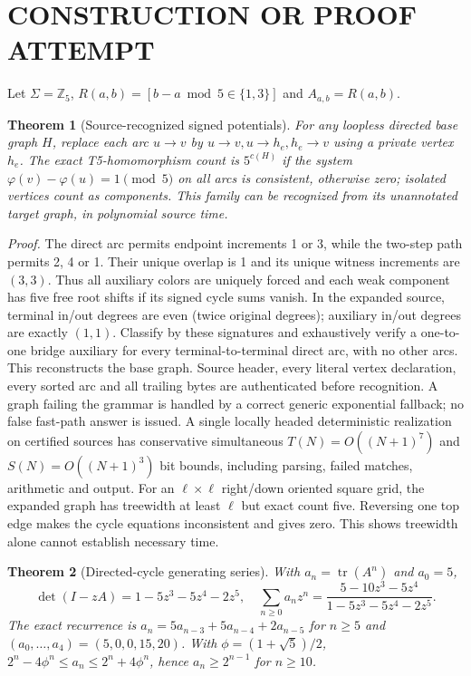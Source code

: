 \documentclass[11pt]{article}
\newtheorem{theorem}{Theorem}
\begin{document}
\section{CONSTRUCTION OR PROOF ATTEMPT}
Let $\Sigma=\mathbb Z_5$, $R(a,b)=[b-a\bmod5\in\{1,3\}]$ and $A_{a,b}=R(a,b)$.
\begin{theorem}[Source-recognized signed potentials]
For any loopless directed base graph $H$, replace each arc $u\to v$ by $u\to v,u\to h_e,h_e\to v$ using a private vertex $h_e$. The exact T5-homomorphism count is $5^{c(H)}$ if the system $\varphi(v)-\varphi(u)=1\pmod5$ on all arcs is consistent, otherwise zero; isolated vertices count as components. This family can be recognized from its unannotated target graph, in polynomial source time.
\end{theorem}
\noindent\emph{Proof.} The direct arc permits endpoint increments 1 or 3, while the two-step path permits 2, 4 or 1. Their unique overlap is 1 and its unique witness increments are $(3,3)$. Thus all auxiliary colors are uniquely forced and each weak component has five free root shifts if its signed cycle sums vanish. In the expanded source, terminal in/out degrees are even (twice original degrees); auxiliary in/out degrees are exactly $(1,1)$. Classify by these signatures and exhaustively verify a one-to-one bridge auxiliary for every terminal-to-terminal direct arc, with no other arcs. This reconstructs the base graph. Source header, every literal vertex declaration, every sorted arc and all trailing bytes are authenticated before recognition. A graph failing the grammar is handled by a correct generic exponential fallback; no false fast-path answer is issued. A single locally headed deterministic realization on certified sources has conservative simultaneous $T(N)=O((N+1)^7)$ and $S(N)=O((N+1)^3)$ bit bounds, including parsing, failed matches, arithmetic and output.
For an $\ell\times\ell$ right/down oriented square grid, the expanded graph has treewidth at least $\ell$ but exact count five. Reversing one top edge makes the cycle equations inconsistent and gives zero. This shows treewidth alone cannot establish necessary time.
\begin{theorem}[Directed-cycle generating series]
With $a_n=\operatorname{tr}(A^n)$ and $a_0=5$,
\[
\det(I-zA)=1-5z^3-5z^4-2z^5,\quad
\sum_{n\ge0}a_nz^n=\frac{5-10z^3-5z^4}{1-5z^3-5z^4-2z^5}.
\]
The exact recurrence is $a_n=5a_{n-3}+5a_{n-4}+2a_{n-5}$ for $n\ge5$ and $(a_0,\ldots,a_4)=(5,0,0,15,20)$. With $\phi=(1+\sqrt5)/2$, $2^n-4\phi^n\le a_n\le2^n+4\phi^n$, hence $a_n\ge2^{n-1}$ for $n\ge10$.
\end{theorem}
\end{document}
